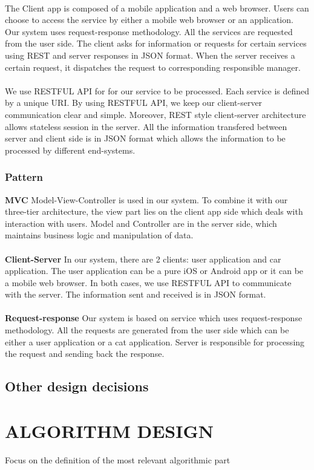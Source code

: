 \documentclass{article}
\begin{document}
	\\The Client app is composed of a mobile application and a web browser. Users can choose to access the service by either a mobile web browser or an application. Our system uses request-response methodology. All the services are requested from the user side. The client asks for information or requests for certain services using REST and server responses in JSON format. When the server receives a certain request, it dispatches the request to corresponding responsible manager. 
	\\
	\\We use RESTFUL API for for our service to be processed. Each service is defined by a unique URI. By using RESTFUL API, we keep our client-server communication clear and simple. Moreover, REST style client-server architecture allows stateless session in the server. All the information transfered between server and client side is in JSON format which allows the information to be processed by different end-systems. 
	\subsubsection{Pattern}
	\textbf{MVC} Model-View-Controller is used in our system. To combine it with our three-tier architecture, the view part lies on the client app side which deals with interaction with users. Model and Controller are in the server side, which maintains business logic and manipulation of data. 
	\\
	\\\textbf{Client-Server} In our system, there are 2 clients: user application and car application. The user application can be a pure iOS or Android app or it can be a mobile web browser. In both cases, we use RESTFUL API to communicate with the server. The information sent and received is in JSON format.
	\\
	\\\textbf{Request-response} Our system is based on service which uses request-response methodology. All the requests are generated from the user side which can be either a user application or a cat application. Server is responsible for processing the request and sending back the response.
	
	\subsection{Other design decisions}
	\newpage
	\section{ALGORITHM DESIGN}
	Focus on the definition of the most relevant algorithmic part
	\newpage
\end{document}
